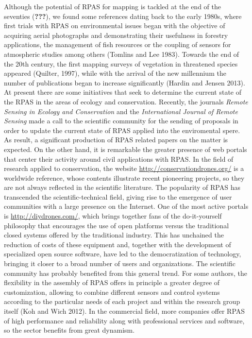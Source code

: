 \documentclass[]{interact}
\theoremstyle{plain}%
\theoremstyle{definition}
\theoremstyle{remark}
\begin{document}
Although the potential of RPAS for mapping is tackled at the end of the
seventies ({\textbf{???}}), we found some references dating back to the
early 1980s, where first trials with RPAS on environmental issues began
with the objective of acquiring aerial photographs and demonstrating
their usefulness in forestry applications, the management of fish
resources or the coupling of sensors for atmospheric studies among
others (Tomlins and Lee 1983). Towards the end of the 20th century, the
first mapping surveys of vegetation in threatened species appeared
(Quilter, 1997), while with the arrival of the new millennium the number
of publications began to increase significantly (Hardin and Jensen
2013). At present there are some initiatives that seek to determine the
current state of the RPAS in the areas of ecology and conservation.
Recently, the journals \emph{Remote Sensing in Ecology and Conservation}
and the \emph{International Journal of Remote Sensing} made a call to
the scientific community for the sending of proposals in order to update
the current state of RPAS applied into the enviromental spere. As
result, a significant production of RPAS related papers on the matter is
expected. On the other hand, it is remarkable the greater presence of
web portals that center their activity around civil applications with
RPAS. In the field of research applied to conservation, the website
\url{http://conservationdrones.org/} is a worldwide reference, whose
contents illustrate recent pioneering projects, so they are not always
reflected in the scientific literature. The popularity of RPAS has
transcended the scientific-technical field, giving rise to the emergence
of user communities with a large presence on the Internet. One of the
most active portals is \url{http://diydrones.com/}, which brings
together fans of the do-it-yourself philosophy that encourages the use
of open platforms versus the traditional closed systems offered by the
traditional industry. This has unchained the reduction of costs of these
equipment and, together with the development of specialized open source
software, have led to the democratization of technology, bringing it
closer to a broad number of users and organizations. The scientific
community has probably benefited from this general trend. For some
authors, the flexibility in the assembly of RPAS offers in principle a
greater degree of customization, allowing to combine different sensors
and control systems according to the particular needs of each project
and within the research group itself (Koh and Wich 2012). In the
commercial field, more companies offer RPAS of high performance and
reliability along with professional services and software, so the sector
benefits from great dynamism.
\end{document}
